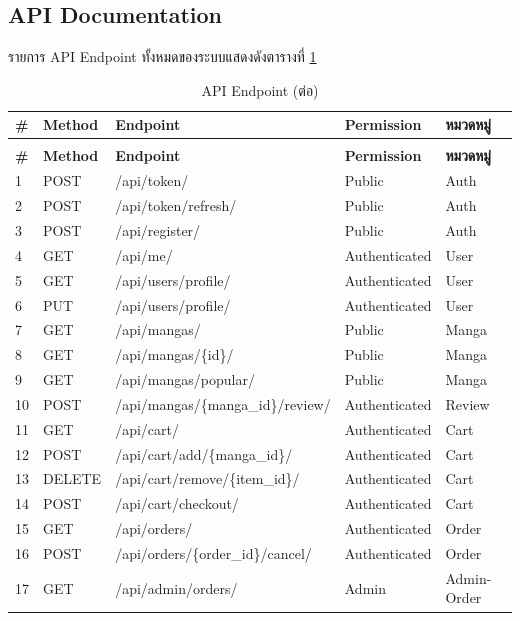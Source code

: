 \subsection{API Documentation}

รายการ API Endpoint ทั้งหมดของระบบแสดงดังตารางที่ \ref{tab:ch4_32}

\begingroup
\small
\begin{longtable}{|p{0.6cm}|p{1.6cm}|p{4.3cm}|p{1.9cm}|p{1.7cm}|}
\caption{API Endpoint} \label{tab:ch4_32} \\
\hline
\textbf{\#} & \textbf{Method} & \textbf{Endpoint} & \textbf{Permission} & \textbf{หมวดหมู่} \\ \hline
\endfirsthead
\caption[]{API Endpoint (ต่อ)} \\
\hline
\textbf{\#} & \textbf{Method} & \textbf{Endpoint} & \textbf{Permission} & \textbf{หมวดหมู่} \\ \hline
\endhead
1 & POST & /api/token/ & Public & Auth \\ \hline
2 & POST & /api/token/refresh/ & Public & Auth \\ \hline
3 & POST & /api/register/ & Public & Auth \\ \hline
4 & GET & /api/me/ & Authenticated & User \\ \hline
5 & GET & /api/users/profile/ & Authenticated & User \\ \hline
6 & PUT & /api/users/profile/ & Authenticated & User \\ \hline
7 & GET & /api/mangas/ & Public & Manga \\ \hline
8 & GET & /api/mangas/\{id\}/ & Public & Manga \\ \hline
9 & GET & /api/mangas/popular/ & Public & Manga \\ \hline
10 & POST & /api/mangas/\{manga\_id\}/review/ & Authenticated & Review \\ \hline
11 & GET & /api/cart/ & Authenticated & Cart \\ \hline
12 & POST & /api/cart/add/\{manga\_id\}/ & Authenticated & Cart \\ \hline
13 & DELETE & /api/cart/remove/\{item\_id\}/ & Authenticated & Cart \\ \hline
14 & POST & /api/cart/checkout/ & Authenticated & Cart \\ \hline
15 & GET & /api/orders/ & Authenticated & Order \\ \hline
16 & POST & /api/orders/\{order\_id\}/cancel/ & Authenticated & Order \\ \hline
17 & GET & /api/admin/orders/ & Admin & Admin-Order \\ \hline

\end{longtable}
